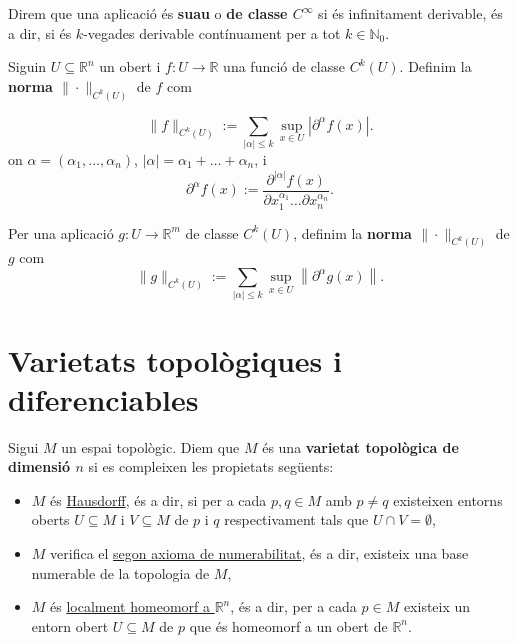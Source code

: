 \begin{defi}
    Direm que una aplicació és \textbf{suau} o \textbf{de classe $C^\infty$} si és infinitament derivable, és a dir, si és $k$-vegades derivable contínuament per a tot $k\in\mathbb N_0$.
\end{defi}

\begin{defi}
    
    Siguin $U\subseteq \mathbb R^n$ un obert i $f:U\to\mathbb R$ una funció de classe $C^k(U)$. Definim la \textbf{norma $\|\cdot\|_{C^k(U)}$} de $f$ com

    \begin{equation*}
        \|f\|_{C^k(U)} := \sum_{|\alpha| \leq k} \sup_{x\in U} \left| \partial^\alpha f(x) \right|.
    \end{equation*}
    on $\alpha = (\alpha_1, \dots, \alpha_n)$, $|\alpha| = \alpha_1 + \dots + \alpha_n$, i
    \[
    \partial^\alpha f(x) := \frac{\partial^{|\alpha|} f(x)}{\partial x_1^{\alpha_1} \dots \partial x_n^{\alpha_n}}.
    \]

    Per una aplicació $g:U\to\mathbb{R}^m$ de classe $C^k(U)$, definim la \textbf{norma $\|\cdot\|_{C^k(U)}$} de $g$ com
    \begin{equation*}
        \|g\|_{C^k(U)} := \sum_{|\alpha| \leq k} \sup_{x\in U} \left\| \partial^\alpha g(x) \right\|.
    \end{equation*}    
\end{defi}

\section{Varietats topològiques i diferenciables}
\begin{defi} 
    Sigui $M$ un espai topològic. Diem que $M$ és una \textbf{varietat topològica de dimensió $n$} si es compleixen les propietats següents:
    \begin{itemize}
        \item $M$ és \underline{Hausdorff}, és a dir, si per a cada $p,q\in M$ amb $p\neq q$ existeixen entorns oberts $U\subseteq M$ i $V\subseteq M$ de $p$ i $q$ respectivament tals que $U\cap V = \emptyset$,
        \item $M$ verifica el \underline{segon axioma de numerabilitat}, és a dir, existeix una base numerable de la topologia de $M$,
        \item $M$ és \underline{localment homeomorf a $\mathbb R^n$}, és a dir, per a cada $p\in M$ existeix un entorn obert $U\subseteq M$ de $p$ que és homeomorf a un obert de $\mathbb R^n$.
    \end{itemize}
\end{defi}

